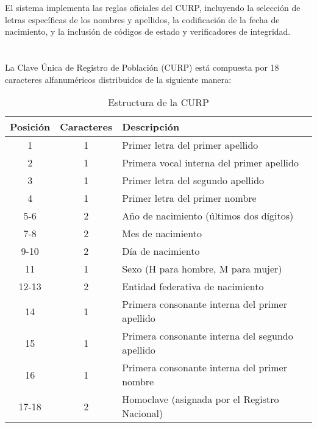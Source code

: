 \documentclass[10pt,a4paper]{article}
\begin{document}
El sistema implementa las reglas oficiales del CURP, incluyendo la selección de letras específicas de los nombres y apellidos, la codificación de la fecha de nacimiento, y la inclusión de códigos de estado y verificadores de integridad.

\pagebreak

\section{\color{colorIPN}{Estructura del CURP}}
La Clave Única de Registro de Población (CURP) está compuesta por 18 caracteres alfanuméricos distribuidos de la siguiente manera:

\begin{table}[H]
	\centering
	\hspace*{0pt}
	\begin{tabular}{|c|c|l|}
		\hline
		\textbf{Posición} & \textbf{Caracteres} & \textbf{Descripción} \\ \hline
		1 & 1 & Primer letra del primer apellido \\ \hline
		2 & 1 & Primera vocal interna del primer apellido \\ \hline
		3 & 1 & Primer letra del segundo apellido \\ \hline
		4 & 1 & Primer letra del primer nombre \\ \hline
		5-6 & 2 & Año de nacimiento (últimos dos dígitos) \\ \hline
		7-8 & 2 & Mes de nacimiento \\ \hline
		9-10 & 2 & Día de nacimiento \\ \hline
		11 & 1 & Sexo (H para hombre, M para mujer) \\ \hline
		12-13 & 2 & Entidad federativa de nacimiento \\ \hline
		14 & 1 & Primera consonante interna del primer apellido \\ \hline
		15 & 1 & Primera consonante interna del segundo apellido \\ \hline
		16 & 1 & Primera consonante interna del primer nombre \\ \hline
		17-18 & 2 & Homoclave (asignada por el Registro Nacional) \\ \hline
	\end{tabular}
	\caption{Estructura de la CURP}
	\label{tab:estructura_curp}
\end{table}
\end{document}

